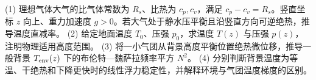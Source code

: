 (1) 理想气体大气的比气体常数为 \(R_s\)、比热为 \(c_p,c_v\)，满足 \(c_p-c_v=R_s\)。竖直坐标 \(z\) 向上、重力加速度 \(g>0\)。若大气处于静水压平衡且沿竖直方向可逆绝热，推导温度直减率。
(2) 给定地面温度 \(T_0\)、压强 \(p_0\)，求温度 \(T(z)\) 与压强 \(p(z)\)，注明物理适用高度范围。
(3) 将一小气团从背景高度平衡位置绝热微位移，推导一般背景 \(T_{\rm env}(z)\) 下的布伦特—魏萨拉频率平方 \(N^2\)。
(4) 分别判断背景温度为等温、干绝热和下降更快时的线性浮力稳定性，并解释环境与气团温度梯度的区别。
